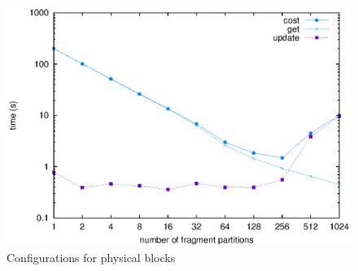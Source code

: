 \begin{figure}[t]
\centering
\includegraphics[width=0.8\columnwidth,valign=t]{figures/fig13}
\caption{\label{ms:fig:physical}Configurations for physical blocks}
\end{figure}
